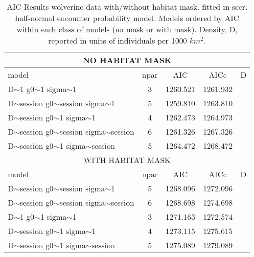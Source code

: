 \begin{table}[ht]
\centering
\caption{
AIC Results wolverine data with/without habitat mask. fitted
in secr. half-normal encounter probability model. Models ordered by
AIC within each class of models (no mask or with mask).  Density, D,
reported in units of individuals per 1000 $km^2$.
}
\begin{tabular}{lcccc}
\hline \hline
\multicolumn{5}{c}{NO HABITAT MASK} \\ \hline
  model & npar & AIC & AICc & D \\ \hline
D$\sim$1 g0$\sim$1 sigma$\sim$1                &    3&  1260.521& 1261.932 & \\
D$\sim$session g0$\sim$session sigma$\sim$1    &    5&  1259.810& 1263.810 &\\
D$\sim$session g0$\sim$1 sigma$\sim$1          &    4&  1262.473& 1264.973 &\\
D$\sim$session g0$\sim$session sigma$\sim$session&  6&  1261.326& 1267.326 &\\
D$\sim$session g0$\sim$1 sigma$\sim$session      &  5&  1264.472& 1268.472 &\\
\hline \hline
\multicolumn{5}{c}{WITH HABITAT MASK} \\ \hline
  model & npar & AIC & AICc & D \\ \hline
D$\sim$session g0$\sim$session sigma$\sim$1       &    5& 1268.096& 1272.096 & \\
D$\sim$session g0$\sim$session sigma$\sim$session &    6& 1268.698& 1274.698 &\\
D$\sim$1       g0$\sim$1       sigma$\sim$1       &    3& 1271.163& 1272.574 &\\
D$\sim$session g0$\sim$1       sigma$\sim$1       &    4& 1273.115& 1275.615 &\\
D$\sim$session g0$\sim$1       sigma$\sim$session &    5& 1275.089& 1279.089 &\\
\hline
\end{tabular}
\label{gof.tab.aic}
\end{table}


